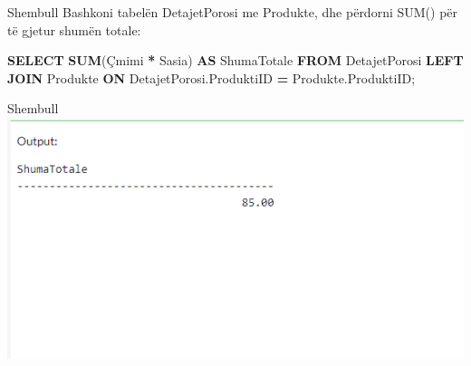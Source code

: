\documentclass[
  ignorenonframetext,
]{beamer}
\newenvironment{Shaded}{\begin{snugshade}}{\end{snugshade}}
\newcommand{\FunctionTok}[1]{\textcolor[rgb]{0.13,0.29,0.53}{\textbf{#1}}}
\newcommand{\KeywordTok}[1]{\textcolor[rgb]{0.13,0.29,0.53}{\textbf{#1}}}
\newcommand{\NormalTok}[1]{#1}
\newcommand{\OperatorTok}[1]{\textcolor[rgb]{0.81,0.36,0.00}{\textbf{#1}}}
\begin{document}
\begin{frame}[fragile]{Shembull}
\label{shembull-45}
Bashkoni tabelën DetajetPorosi me Produkte, dhe përdorni SUM() për të
gjetur shumën totale:


\begin{Shaded}
\begin{Highlighting}[]
\KeywordTok{SELECT} \FunctionTok{SUM}\NormalTok{(Çmimi }\OperatorTok{*}\NormalTok{ Sasia) }\KeywordTok{AS}\NormalTok{ ShumaTotale}
\KeywordTok{FROM}\NormalTok{ DetajetPorosi}
\KeywordTok{LEFT} \KeywordTok{JOIN}\NormalTok{ Produkte }\KeywordTok{ON}\NormalTok{ DetajetPorosi.ProduktiID }\OperatorTok{=}\NormalTok{ Produkte.ProduktiID;}
\end{Highlighting}
\end{Shaded}
\end{frame}

\begin{frame}{Shembull}
\label{shembull-46}
\includegraphics{./Figs/query56.png}
\end{frame}
\end{document}
